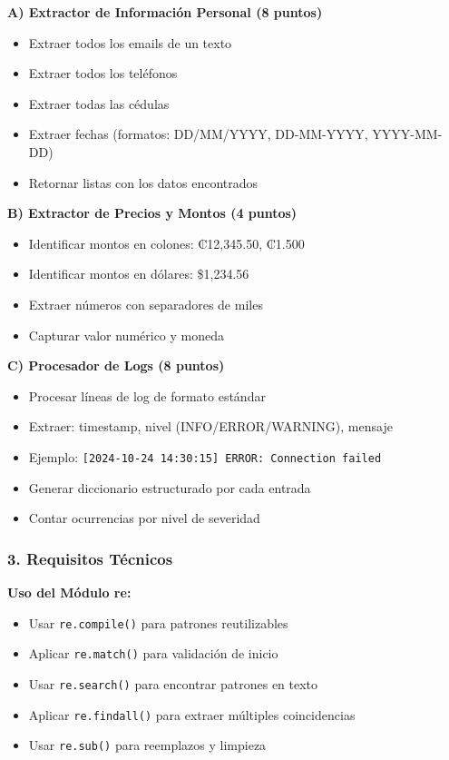 \documentclass[11pt,letterpaper]{article}
\begin{document}
\textbf{A) Extractor de Información Personal (8 puntos)}
\begin{itemize}
    \item Extraer todos los emails de un texto
    \item Extraer todos los teléfonos
    \item Extraer todas las cédulas
    \item Extraer fechas (formatos: DD/MM/YYYY, DD-MM-YYYY, YYYY-MM-DD)
    \item Retornar listas con los datos encontrados
\end{itemize}

\textbf{B) Extractor de Precios y Montos (4 puntos)}
\begin{itemize}
    \item Identificar montos en colones: ₡12,345.50, ₡1.500
    \item Identificar montos en dólares: \$1,234.56
    \item Extraer números con separadores de miles
    \item Capturar valor numérico y moneda
\end{itemize}

\textbf{C) Procesador de Logs (8 puntos)}
\begin{itemize}
    \item Procesar líneas de log de formato estándar
    \item Extraer: timestamp, nivel (INFO/ERROR/WARNING), mensaje
    \item Ejemplo: \texttt{[2024-10-24 14:30:15] ERROR: Connection failed}
    \item Generar diccionario estructurado por cada entrada
    \item Contar ocurrencias por nivel de severidad
\end{itemize}

\subsubsection{3. Requisitos Técnicos}

\textbf{Uso del Módulo re:}
\begin{itemize}
    \item Usar \texttt{re.compile()} para patrones reutilizables
    \item Aplicar \texttt{re.match()} para validación de inicio
    \item Usar \texttt{re.search()} para encontrar patrones en texto
    \item Aplicar \texttt{re.findall()} para extraer múltiples coincidencias
    \item Usar \texttt{re.sub()} para reemplazos y limpieza
\end{itemize}
\end{document}
